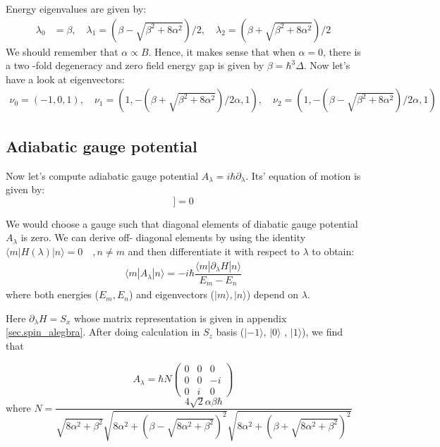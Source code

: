 \documentclass[11pt,a4paper]{article}
\begin{document}
 Energy eigenvalues are given by:
\begin{align*}
\lambda_0 &= \beta, \quad \lambda_1 = (\beta - \sqrt{\beta^2 + 8 \alpha^2})/2 , \quad  \lambda_2 = (\beta + \sqrt{\beta^2 + 8 \alpha^2})/2
\end{align*}
We should remember that $\alpha \propto B$. Hence, it makes sense that when $\alpha=0$,  there is a two -fold degeneracy and zero field energy gap is given by $\beta=\hbar^3 \Delta$. Now let's have a look at eigenvectors:
\begin{align*}
\nu_0 = (-1,0,1), \quad \nu_1 = (1, -(\beta + \sqrt{\beta^2 + 8 \alpha^2})/2 \alpha, 1) , \quad \nu_2 = (1, -(\beta - \sqrt{\beta^2 + 8 \alpha^2})/2 \alpha, 1)
\end{align*}

\subsection{Adiabatic gauge potential}

Now let's compute adiabatic gauge potential $A_{\lambda}= i \hbar \partial_{\lambda}$. Its' equation of motion is given by:
\begin{equation}
[H, \partial_{\lambda} H +\dfrac{i}{\hbar} [A_{\lambda}, H] ]=0
\label{eom}
\end{equation}

We would choose a gauge such that diagonal elements of diabatic gauge potential $A_{\lambda}$ is zero. We can derive off- diagonal elements by using the identity $\langle m |H(\lambda) | n \rangle=0 \quad, n \neq m$ and then differentiate it with respect to $\lambda$ to obtain:
\begin{align}
\langle m |A_{\lambda} | n \rangle =  -i \hbar \dfrac{\langle m |\partial_{\lambda}H | n \rangle}{E_m-E_n}
\end{align}
where both  energies ($E_m, E_n$) and eigenvectors ($|m \rangle, |n \rangle$) depend on $\lambda$.

Here $\partial_{\lambda} H=S_x$ whose matrix representation is given in appendix \ref{sec.spin_alegbra}. After doing calculation in $S_z$ basis ($|- 1\rangle$, $| 0 \rangle$ , $| 1 \rangle$), we find that

\begin{equation}
A_{\lambda}=\hbar N
\begin{pmatrix}
0 & 0 & 0\\
0 & 0 & -i \\
0 & i & 0
\end{pmatrix}
\end{equation}
where $N=\dfrac{4\sqrt{2} \alpha \beta \hbar}{\sqrt{8 \alpha^{2} + \beta^{2}} \sqrt{8 \alpha^{2} + \left(\beta - \sqrt{8 \alpha^{2} + \beta^{2}}\right)^{2}} \sqrt{8 \alpha^{2} + \left(\beta + \sqrt{8 \alpha^{2} + \beta^{2}}\right)^{2}}}$
\end{document}

